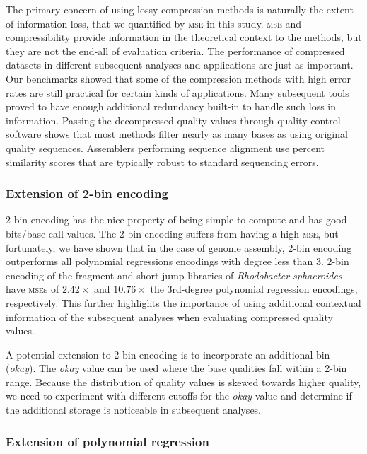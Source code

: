The primary concern of using lossy compression methods is naturally
the extent of information loss, that we quantified by \textsc{mse} in
this study. \textsc{mse} and compressibility provide information in
the theoretical context to the methods, but they are not the end-all
of evaluation criteria. The performance of compressed datasets in
different subsequent analyses and applications are just as
important. Our benchmarks showed that some of the compression methods
with high error rates are still practical for certain kinds of
applications. Many subsequent tools proved to have enough additional
redundancy built-in to handle such loss in information. Passing the
decompressed quality values through quality control software shows
that most methods filter nearly as many bases as using original
quality sequences. Assemblers performing sequence alignment use
percent similarity scores that are typically robust to standard
sequencing errors.

\subsubsection{Extension of 2-bin encoding}

2-bin encoding has the nice property of being simple to compute and
has good bits/base-call values. The 2-bin encoding suffers from having
a high \textsc{mse}, but fortunately, we have shown that in the case
of genome assembly, 2-bin encoding outperforms all polynomial
regressions encodings with degree less than 3. 2-bin encoding of the
fragment and short-jump libraries of \textit{Rhodobacter sphaeroides}
have \textsc{mse}s of $2.42\times$ and $10.76\times$ the 3rd-degree
polynomial regression encodings, respectively. This further highlights
the importance of using additional contextual information of the
subsequent analyses when evaluating compressed quality values.

A potential extension to 2-bin encoding is to incorporate an
additional bin (\emph{okay}). The \emph{okay} value can be used where
the base qualities fall within a 2-bin range. Because the distribution
of quality values is skewed towards higher quality, we need to
experiment with different cutoffs for the \emph{okay} value and
determine if the additional storage is noticeable in subsequent
analyses.

\subsubsection{Extension of polynomial regression}

